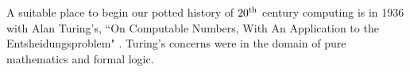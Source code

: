 



A suitable place to begin our potted history of $20^{\rm th}$
century computing is in 1936 with Alan Turing's, ``On Computable Numbers, 
With An Application to the Entsheidungsproblem"
\cite{turing36a}. Turing's concerns were in the domain of pure mathematics and
formal logic. 


